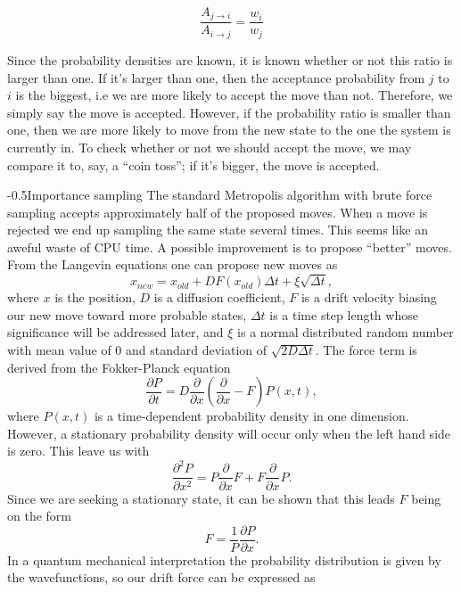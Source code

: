 \documentclass[english, a4paper]{article}
\makeatletter
\renewcommand{\subsubsection}{\@startsection{subsubsection}{3}{0pt}%
{-\baselineskip}{0.5\baselineskip}{\bf\large}}
\makeatother
\begin{document}
\begin{equation}
 \frac{A_{j\rightarrow i}}{A_{i\rightarrow j}} = \frac{w_i}{w_j}
\end{equation}

Since the probability densities are known, it is known whether or not this ratio is larger than one. If it's larger than one, then the acceptance probability from $j$ to $i$ is the biggest, i.e we are more likely to accept the move than not.
Therefore, we simply say the move is accepted. However, if the probability ratio is smaller than one, then we are more likely to move from the new state to the one the system is currently in.
To check whether or not we should accept the move, we may compare it to, say, a ``coin toss''; if it's bigger, the move is accepted.

\subsubsection{Importance sampling} \label{importanceSampling}
The standard Metropolis algorithm with brute force sampling accepts approximately half of the proposed moves. 
When a move is rejected we end up sampling the same state several times. This seems like an aweful waste of CPU time.
A possible improvement is to propose   ``better'' moves. From the Langevin equations one can propose new moves as
\begin{equation}
	x_{new} = x_{old}+DF(x_{old})\Delta t +\xi\sqrt{\Delta t},	\label{importanceSamplingMove}
\end{equation}
where $x$ is the position, 
$D$ is a diffusion coefficient, 
$F$ is a drift velocity biasing our new move toward more probable states, 
$\Delta t$ is a time step length whose significance will be addressed later, 
and $\xi$ is a normal distributed random number with mean value of 0 and standard deviation of $\sqrt{2D\Delta t}$. 
The force term is derived from the Fokker-Planck equation 
\begin{equation}
	\frac{\partial P}{\partial t} = D\frac{\partial }{\partial x}\left(\frac{\partial }{\partial x} -F\right)P(x,t),
\end{equation}
where $P(x,t)$ is a time-dependent probability density in one dimension. However, a stationary probability density will occur only when the left hand side is zero.
This leave us with
\begin{equation}
	\frac{\partial^2 P}{\partial {x^2}} = P\frac{\partial}{\partial {x}}F + F\frac{\partial}{\partial {x}}P.
\end{equation}
Since we are seeking a stationary state, it can be shown that this leads $F$ being on the form
\begin{equation}
	F = \frac{1}{P} \frac{\partial P}{\partial x}.
\end{equation}
In a quantum mechanical interpretation the probability distribution is given by the wavefunctions, so our drift force can be expressed as
\end{document}
